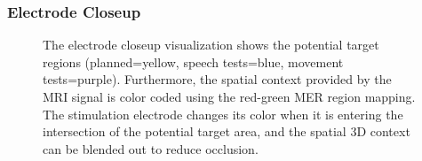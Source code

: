 \documentclass{vgtc}                          %
\begin{document}

\subsubsection{Electrode Closeup}\label{sec:overview:placement:targetareaview}

\begin{figure}[t]
  \centering
  \caption{The electrode closeup visualization shows the potential target regions (planned=yellow, speech tests=blue, movement tests=purple). Furthermore, the spatial context provided by the MRI signal is color coded using the red-green MER region mapping. The stimulation electrode changes its color when it is entering the intersection of the potential target area, and the spatial 3D context can be blended out to reduce occlusion.}
  \label{fig:targetregion}
\end{figure}
\end{document}

